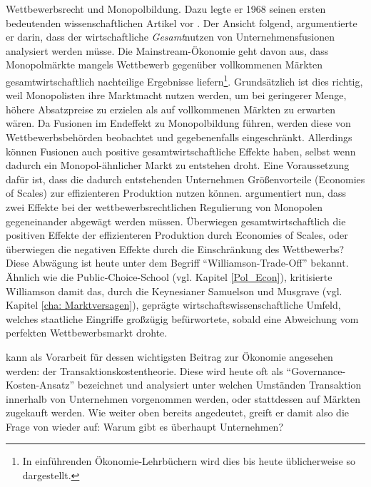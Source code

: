Wettbewerbsrecht und Monopolbildung. Dazu legte er 1968 seinen ersten bedeutenden wissenschaftlichen Artikel vor \parencite{Williamson1968}. Der Ansicht \textcite{Coase1960, Coase1937} folgend, argumentierte er darin, dass der wirtschaftliche \textit{Gesamt}nutzen von Unternehmensfusionen analysiert werden müsse. Die Mainstream-Ökonomie geht davon aus, dass Monopolmärkte mangels Wettbewerb gegenüber vollkommenen Märkten gesamtwirtschaftlich nachteilige Ergebnisse liefern\footnote{In einführenden Ökonomie-Lehrbüchern wird dies bis heute üblicherweise so dargestellt.}. Grundsätzlich ist dies richtig, weil Monopolisten ihre Marktmacht nutzen werden, um bei geringerer Menge, höhere Absatzpreise zu erzielen als auf vollkommenen Märkten zu erwarten wären. Da Fusionen im Endeffekt zu Monopolbildung führen, werden diese von Wettbewerbsbehörden beobachtet und gegebenenfalls eingeschränkt. Allerdings können Fusionen auch positive gesamtwirtschaftliche Effekte haben, selbst wenn dadurch ein Monopol-ähnlicher Markt zu entstehen droht. Eine Voraussetzung dafür ist, dass die dadurch entstehenden Unternehmen Größenvorteile (Economies of Scales) zur effizienteren Produktion nutzen können. \textcite{Williamson1968} argumentiert nun, dass zwei Effekte bei der wettbewerbsrechtlichen Regulierung von Monopolen gegeneinander abgewägt werden müssen. Überwiegen gesamtwirtschaftlich die positiven Effekte der effizienteren Produktion durch Economies of Scales, oder überwiegen die negativen Effekte durch die Einschränkung des Wettbewerbs? Diese Abwägung ist heute unter dem Begriff "`Williamson-Trade-Off"' bekannt. Ähnlich wie die Public-Choice-School (vgl. Kapitel \ref{Pol_Econ}), kritisierte Williamson damit das, durch die Keynesianer Samuelson und Musgrave (vgl. Kapitel \ref{cha: Marktversagen}), geprägte wirtschaftswissenschaftliche Umfeld, welches staatliche Eingriffe großzügig befürwortete, sobald eine Abweichung vom perfekten Wettbewerbsmarkt drohte. 

\textcite{Williamson1968} kann als Vorarbeit für dessen wichtigsten Beitrag zur Ökonomie angesehen werden: der Transaktionskostentheorie. Diese wird heute oft als "`Governance-Kosten-Ansatz"' bezeichnet und analysiert unter welchen Umständen Transaktion innerhalb von Unternehmen vorgenommen werden, oder stattdessen auf Märkten zugekauft werden. Wie weiter oben bereits angedeutet, greift er damit also die Frage von \textcite{Coase1937} wieder auf: Warum gibt es überhaupt Unternehmen?

